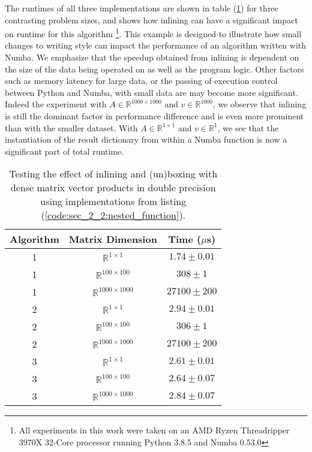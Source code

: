 The runtimes of all three implementations are shown in table (\ref{table:sec_2_2:boxing_inlining}) for three contrasting problem sizes, and shows how inlining can have a significant impact on runtime for this algorithm \footnote{All experiments in this work were taken on an AMD Ryzen Threadripper 3970X 32-Core processor running Python 3.8.5 and Numba 0.53.0}. This example is designed to illustrate how small changes to writing style can impact the performance of an algorithm written with Numba. We emphasize that the speedup obtained from inlining is dependent on the size of the data being operated on as well as the program logic. Other factors such as memory latency for large data, or the passing of execution control between Python and Numba, with small data are may become more significant. Indeed the experiment with $A \in \mathbb{R}^{1000 \times 1000}$ and $v \in \mathbb{R}^{1000}$, we observe that inlining is still the dominant factor in performance difference and is even more prominent than with the smaller dataset. With $A \in \mathbb{R}^{1 \times 1}$ and $v \in \mathbb{R}^1$, we see that the instantiation of the result dictionary from within a Numba function is now a significant part of total runtime.

\begin{table}[h!]
    \centering
    \begin{tabular}{||c c c||} 
        \hline
        Algorithm & Matrix Dimension & Time ($\mu$s) \\ [0.5ex]
        \hline\hline
        1 & $\mathbb{R}^{1 \times 1}$ &       $1.74  \pm 0.01$     \\
        1 & $\mathbb{R}^{100 \times 100}$ &   $308  \pm 1$  \\
        1 & $\mathbb{R}^{1000 \times 1000}$ & $27100 \pm 200$  \\
        \hline
        2 & $\mathbb{R}^{1 \times 1}$ &       $2.94  \pm 0.01$     \\
        2 & $\mathbb{R}^{100 \times 100}$ &   $306   \pm 1$ \\
        2 & $\mathbb{R}^{1000 \times 1000}$ & $27100 \pm 200$\\
        \hline
        3 & $\mathbb{R}^{1 \times 1}$ &        $2.61  \pm 0.01$ \\
        3 & $\mathbb{R}^{100 \times 100}$ &    $2.64  \pm 0.07$ \\
        3 & $\mathbb{R}^{1000 \times 1000}$ &  $2.84  \pm 0.07$  \\
        \hline
    \end{tabular}
    \caption{ Testing the effect of inlining and (un)boxing with dense matrix vector products in double precision using implementations from listing (\ref{code:sec_2_2:nested_function}).}
    \label{table:sec_2_2:boxing_inlining}
\end{table}

